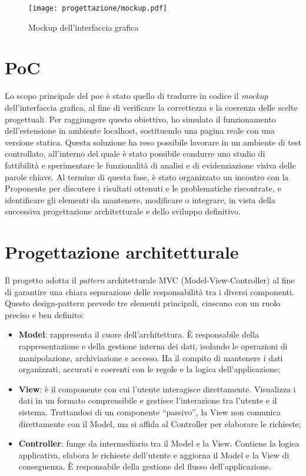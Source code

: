 \begin{figure}[H]
  \centering 
  \texttt{[image: progettazione/mockup.pdf]} 
  \caption{Mockup dell'interfaccia grafica}
\end{figure}

\section{PoC}
\label{sec:poc}

\par Lo scopo principale del \gls{poc} è stato quello di tradurre in codice il \textit{mockup} dell’interfaccia grafica, al fine di verificare la correttezza e la coerenza delle scelte progettuali. Per raggiungere questo obiettivo, ho simulato il funzionamento dell’estensione in ambiente \gls{localhost}, sostituendo una pagina reale con una versione statica. Questa soluzione ha reso possibile lavorare in un ambiente di test controllato, all’interno del quale è stato possibile condurre uno studio di fattibilità e sperimentare le funzionalità di analisi e di evidenziazione visiva delle parole chiave. Al termine di questa fase, è stato organizzato un incontro con la Proponente per discutere i risultati ottenuti e le problematiche riscontrate, e identificare gli elementi da mantenere, modificare o integrare, in vista della successiva progettazione architetturale e dello sviluppo definitivo.

\section{Progettazione architetturale}
\label{sec:progettazione}

\par Il progetto adotta il \textit{pattern} architetturale MVC (Model-View-Controller) al fine di garantire una chiara separazione delle responsabilità tra i diversi componenti. Questo \gls{design-pattern} prevede tre elementi principali, ciascuno con un ruolo preciso e ben definito:
\begin{itemize}
  \item \textbf{Model}: rappresenta il cuore dell’architettura. È responsabile della rappresentazione e della gestione interna dei dati, isolando le operazioni di manipolazione, archiviazione e accesso. Ha il compito di mantenere i dati organizzati, accurati e coerenti con le regole e la logica dell’applicazione;
  \item \textbf{View}: è il componente con cui l’utente interagisce direttamente. Visualizza i dati in un formato comprensibile e gestisce l’interazione tra l’utente e il sistema. Trattandosi di un componente “passivo”, la View non comunica direttamente con il Model, ma si affida al Controller per elaborare le richieste;
  \item \textbf{Controller}: funge da intermediario tra il Model e la View. Contiene la logica applicativa, elabora le richieste dell’utente e aggiorna il Model e la View di conseguenza. È responsabile della gestione del flusso dell’applicazione.
\end{itemize}

